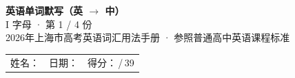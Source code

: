 \documentclass[10pt,a4paper]{article}
\begin{document}
\pagestyle{plain}

\begin{center}
{\LARGE\bfseries 英语单词默写（英 $\to$ 中）}\\[0.22em]
{\large I 字母 · 第 1 / 4 份}\\[0.18em]
{\small 2026年上海市高考英语词汇用法手册 · 参照普通高中英语课程标准}
\end{center}

\vspace{0.25em}
\noindent\begin{tabular}{@{}p{}@{}p{}@{}p{}@{}}
姓名：\underline{\hspace{2.0cm}} & 日期：\underline{\hspace{2.0cm}} & 得分：\underline{\hspace{1.3cm}}\,/\,39 \\
\end{tabular}

\vspace{0.3em}

\vspace{0.08em}
\end{document}
